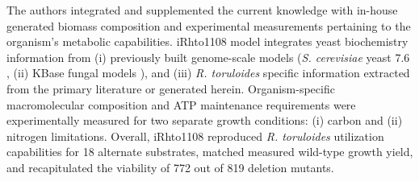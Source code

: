 The authors integrated and supplemented the current knowledge with in-house generated biomass composition and experimental
measurements pertaining to the organism's metabolic capabilities. 
iRhto1108 model integrates yeast biochemistry information from (i) previously built genome-scale
models (\textit{S. cerevisiae} yeast 7.6 \cite{Aung2013}, (ii) KBase fungal
models \cite{Arkin2018}), and (iii) \textit{R. toruloides} specific information
extracted from the primary literature \cite{Coradetti2018}\cite{Jagtap2017}\cite{Kot2018} or generated herein. 
Organism-specific macromolecular composition and ATP maintenance requirements were experimentally measured for two separate growth conditions: (i) carbon and
(ii) nitrogen limitations. Overall, iRhto1108 reproduced \textit{R. toruloides} utilization capabilities for 18 alternate substrates, matched measured wild-type growth yield,
and recapitulated the viability of 772 out of 819 deletion mutants. \cite{Dinh2019}





